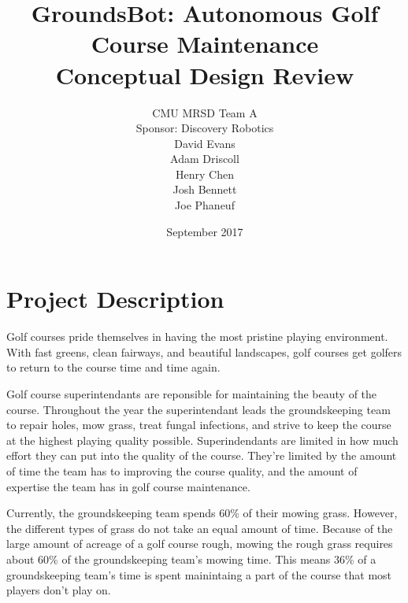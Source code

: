 \documentclass[12pt]{extarticle}
\begin{document}


\title{GroundsBot: Autonomous Golf Course Maintenance \\[.5ex]
		\Large Conceptual Design Review}
\date{September 2017}
\author{CMU MRSD Team A        \\ Sponsor: Discovery Robotics \\ David Evans \\
        Adam Driscoll \\ Henry Chen  \\
        Josh Bennett  \\ Joe Phaneuf \\ }

\maketitle
\def\svgwidth{\columnwidth}

\newpage

\begin{spacing}{0.95}
\tableofcontents
\end{spacing}

\newpage

\newpage
\section{Project Description}

Golf courses pride themselves in having the most pristine playing environment.  With fast greens, clean fairways, and beautiful landscapes, golf courses get golfers to return to the course time and time again.  

Golf course superintendants are reponsible for maintaining the beauty of the course.  Throughout the year the superintendant leads the groundskeeping team to repair holes, mow grass, treat fungal infections, and strive to keep the course at the highest playing quality possible.  Superindendants are limited in how much effort they can put into the quality of the course.  They're limited by the amount of time the team has to improving the course quality, and the amount of expertise the team has in golf course maintenance.

Currently, the groundskeeping team spends 60\% of their mowing grass.  However, the different types of grass do not take an equal amount of time.  Because of the large amount of acreage of a golf course rough, mowing the rough grass requires about 60\% of the groundskeeping team's mowing time.  This means 36\% of a groundskeeping team's time is spent mainintaing a part of the course that most players don't play on.  
\end{document}
